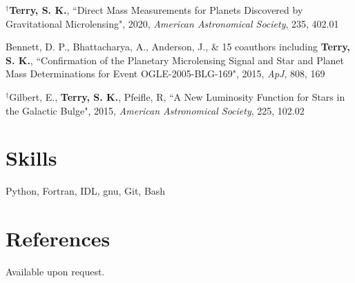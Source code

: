 \documentclass[margin,line]{res}
\begin{document}
\begin{resume}
\begin{etaremune}
\item $^{\dagger}${\bf Terry, S. K.}, ``Direct Mass Measurements for Planets Discovered by Gravitational Microlensing", 2020, \textit{American Astronomical Society}, 235, 402.01

\item Bennett, D. P., Bhattacharya, A., Anderson, J., \& 15 coauthors including {\bf Terry, S. K.}, ``Confirmation of the Planetary Microlensing Signal and Star and Planet Mass Determinations for Event OGLE-2005-BLG-169", 2015, \textit{ApJ}, 808, 169

\item $^{\dagger}$Gilbert, E., {\bf Terry, S. K.}, Pfeifle, R, ``A New Luminosity Function for Stars in the Galactic Bulge", 2015, \textit{American Astronomical Society}, 225, 102.02 \\

\end{etaremune}

\section{\sc Skills}
Python, Fortran, IDL, gnu, Git, Bash


\section{\sc References }
Available upon request.

\end{resume}
\end{document}
